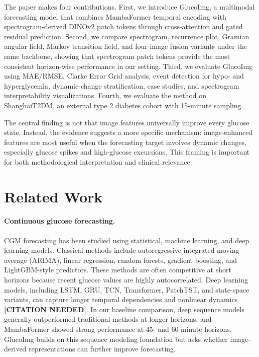 \documentclass[11pt]{article}
\begin{document}
The paper makes four contributions. First, we introduce GlucoImg, a multimodal forecasting model that combines MambaFormer temporal encoding with spectrogram-derived DINOv2 patch tokens through cross-attention and gated residual prediction. Second, we compare spectrogram, recurrence plot, Gramian angular field, Markov transition field, and four-image fusion variants under the same backbone, showing that spectrogram patch tokens provide the most consistent horizon-wise performance in our setting. Third, we evaluate GlucoImg using MAE/RMSE, Clarke Error Grid analysis, event detection for hypo- and hyperglycemia, dynamic-change stratification, case studies, and spectrogram interpretability visualizations. Fourth, we evaluate the method on ShanghaiT2DM, an external type 2 diabetes cohort with 15-minute sampling.

The central finding is not that image features universally improve every glucose state. Instead, the evidence suggests a more specific mechanism: image-enhanced features are most useful when the forecasting target involves dynamic changes, especially glucose spikes and high-glucose excursions. This framing is important for both methodological interpretation and clinical relevance.

\section{Related Work}

\paragraph{Continuous glucose forecasting.}
CGM forecasting has been studied using statistical, machine learning, and deep learning models. Classical methods include autoregressive integrated moving average (ARIMA), linear regression, random forests, gradient boosting, and LightGBM-style predictors. These methods are often competitive at short horizons because recent glucose values are highly autocorrelated. Deep learning models, including LSTM, GRU, TCN, Transformer, PatchTST, and state-space variants, can capture longer temporal dependencies and nonlinear dynamics \textbf{[CITATION NEEDED]}. In our baseline comparison, deep sequence models generally outperformed traditional methods at longer horizons, and MambaFormer showed strong performance at 45- and 60-minute horizons. GlucoImg builds on this sequence modeling foundation but asks whether image-derived representations can further improve forecasting.
\end{document}
